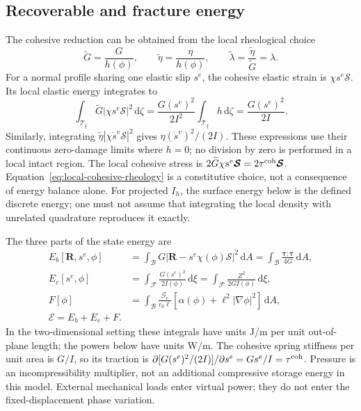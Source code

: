\documentclass[11pt,a4paper]{article}
\newcommand{\B}{\mathcal B}
\newcommand{\F}{\mathcal F}
\newcommand{\Smat}{\bm{\mathcal S}}
\newcommand{\tauv}{\bm\tau}
\newcommand{\R}{\bm R}
\newcommand{\qcoh}{\tau^{\rm coh}}
\newcommand{\Gc}{\mathcal G_c}
\newcommand{\dd}{\,\mathrm d}
\newcommand{\Ecal}{\mathscr E}
\begin{document}
\subsection{Recoverable and fracture energy}

The cohesive reduction can be obtained from the local rheological choice
\begin{equation}
 \widetilde G=\frac G{h(\phi)},\qquad
 \widetilde\eta=\frac\eta{h(\phi)},\qquad
 \widetilde\lambda=\frac{\widetilde\eta}{\widetilde G}=\lambda.
 \label{eq:local-cohesive-rheology}
\end{equation}
For a normal profile sharing one elastic slip $s^e$, the cohesive elastic strain
is $\chi s^e\Smat$. Its local elastic energy integrates to
\begin{equation}
 \int_{\mathcal T_\xi}\widetilde G|\chi s^e\Smat|^2\dd\zeta
 =\frac{G(s^e)^2}{2I^2}\int_{\mathcal T_\xi}h\dd\zeta
 =\frac{G(s^e)^2}{2I}.
 \label{eq:cohesive-reduction}
\end{equation}
Similarly, integrating $\widetilde\eta|\chi\dot s^v\Smat|^2$ gives
$\eta(\dot s^v)^2/(2I)$. These expressions use their continuous zero-damage
limits where $h=0$; no division by zero is performed in a local intact region.
The local cohesive stress is $2\widetilde G\chi s^e\Smat=2\qcoh\Smat$.
Equation~\eqref{eq:local-cohesive-rheology} is a constitutive choice, not a
consequence of energy balance alone. For projected $I_h$, the surface energy
below is the defined discrete energy; one must not assume that integrating
the local density with unrelated quadrature reproduces it exactly.

The three parts of the state energy are
\begin{align}
 E_b[\R,s^e,\phi]
 &=\int_\B G|\R-s^e\chi(\phi)\Smat|^2\dd A
 =\int_\B\frac{\tauv:\tauv}{4G}\dd A,\label{eq:bulk-energy}\\
 E_c[s^e,\phi]
 &=\int_\F\frac{G(s^e)^2}{2I(\phi)}\dd\xi
 =\int_\F\frac{Z^2}{2G I(\phi)}\dd\xi,\label{eq:coh-energy}\\
 F[\phi]&=\int_\B\frac{\Gc}{c_0\ell}
       [\alpha(\phi)+\ell^2|\nabla\phi|^2]\dd A,\label{eq:fracture-energy}\\
 \boxed{\Ecal=E_b+E_c+F.}\label{eq:total-energy}
\end{align}
In the two-dimensional setting these integrals have units J/m per unit
out-of-plane length; the powers below have units W/m.
The cohesive spring stiffness per unit area is $G/I$, so its traction is
$\partial [G(s^e)^2/(2I)]/\partial s^e=Gs^e/I=\qcoh$.
Pressure is an incompressibility multiplier, not an additional compressive
storage energy in this model. External mechanical loads enter virtual power;
they do not enter the fixed-displacement phase variation.
\end{document}
